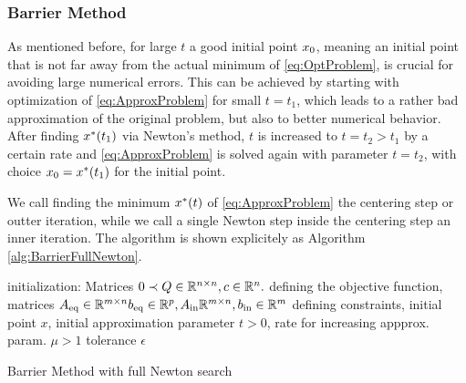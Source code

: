 \subsubsection{Barrier Method}
As mentioned before, for large $ t $ a good initial point $ x_0 $, meaning an initial point that is not far away from the actual minimum of \eqref{eq:OptProblem}, is crucial for avoiding large numerical errors. This can be achieved by starting with optimization of \eqref{eq:ApproxProblem} for small $ t=t_1 $, which leads to a rather bad approximation of the original problem, but also to better numerical behavior. After finding $ x^*(t_1) $ via Newton's method, $ t $ is increased to $ t= t_2 > t_1 $ by a certain rate and  \eqref{eq:ApproxProblem} is solved again with parameter $ t = t_2 $, with choice $ x_0 = x^*(t_1) $ for the initial point.

We call finding the minimum $ x^*(t) $ of  \eqref{eq:ApproxProblem} the centering step or outter iteration, while we call a single Newton step inside  the centering step an inner iteration. The algorithm is shown explicitely as Algorithm  \eqref{alg:BarrierFullNewton}.


\begin{algorithm}
		\SetAlgoLined
		initialization: Matrices $ 0 \prec Q\in \mathbb{R}^{n \times n}, c\in \mathbb{R}^n. $ defining the objective function, matrices $ {A}_{\mathrm{eq}}\in \mathbb{R}^{m \times n} {b}_{\mathrm{eq}}\in \mathbb{R}^p, {A}_{\mathrm{{ in}}}\mathbb{R}^{m\times n}, {b}_{\mathrm{{ in}}}\in \mathbb{R}^m $ defining constraints, initial point $ x $, initial approximation parameter $ t > 0 $, rate for increasing appprox. param. $ \mu > 1 $ tolerance $ \epsilon $\;
		\caption{Barrier Method with full Newton search}
		\label{alg:BarrierFullNewton}
\end{algorithm}



